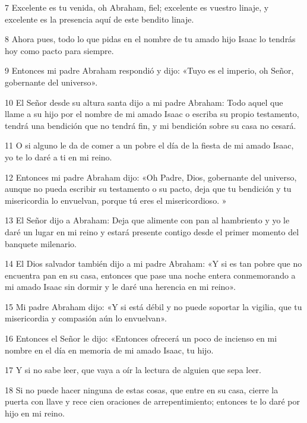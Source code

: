 \par 7 Excelente es tu venida, oh Abraham, fiel; excelente es vuestro linaje, y excelente es la presencia aquí de este bendito linaje.

\par 8 Ahora pues, todo lo que pidas en el nombre de tu amado hijo Isaac lo tendrás hoy como pacto para siempre.

\par 9 Entonces mi padre Abraham respondió y dijo: «Tuyo es el imperio, oh Señor, gobernante del universo».

\par 10 El Señor desde su altura santa dijo a mi padre Abraham: Todo aquel que llame a su hijo por el nombre de mi amado Isaac o escriba su propio testamento, tendrá una bendición que no tendrá fin, y mi bendición sobre su casa no cesará.

\par 11 O si alguno le da de comer a un pobre el día de la fiesta de mi amado Isaac, yo te lo daré a ti en mi reino.

\par 12 Entonces mi padre Abraham dijo: «Oh Padre, Dios, gobernante del universo, aunque no pueda escribir su testamento o su pacto, deja que tu bendición y tu misericordia lo envuelvan, porque tú eres el misericordioso. »

\par 13 El Señor dijo a Abraham: Deja que alimente con pan al hambriento y yo le daré un lugar en mi reino y estará presente contigo desde el primer momento del banquete milenario.

\par 14 El Dios salvador también dijo a mi padre Abraham: «Y si es tan pobre que no encuentra pan en su casa, entonces que pase una noche entera conmemorando a mi amado Isaac sin dormir y le daré una herencia en mi reino».

\par 15 Mi padre Abraham dijo: «Y si está débil y no puede soportar la vigilia, que tu misericordia y compasión aún lo envuelvan».

\par 16 Entonces el Señor le dijo: «Entonces ofrecerá un poco de incienso en mi nombre en el día en memoria de mi amado Isaac, tu hijo.

\par 17 Y si no sabe leer, que vaya a oír la lectura de alguien que sepa leer.

\par 18 Si no puede hacer ninguna de estas cosas, que entre en su casa, cierre la puerta con llave y rece cien oraciones de arrepentimiento; entonces te lo daré por hijo en mi reino.

